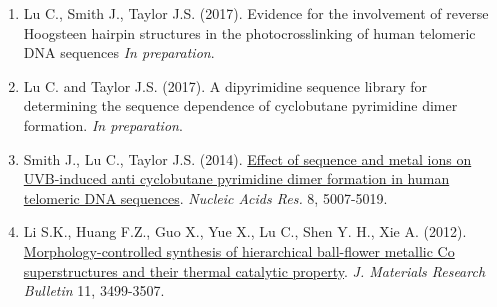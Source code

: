 

\begin{cvparagraph}

\begin{enumerate}
\item Lu C., Smith J., Taylor J.S. (2017). {Evidence for the involvement of reverse Hoogsteen hairpin structures in the photocrosslinking of human telomeric DNA sequences}
  \textit{In preparation}.
\item Lu C. and Taylor J.S. (2017). {A dipyrimidine sequence library for determining the sequence dependence of cyclobutane pyrimidine dimer formation}.
  \textit{In preparation}.
\item Smith J., Lu C., Taylor J.S. (2014). \href{https://academic.oup.com/nar/article/42/8/5007/1075895/Effect-of-sequence-and-metal-ions-on-UVB-induced}{Effect of sequence and metal ions on UVB-induced anti cyclobutane pyrimidine dimer formation in human telomeric DNA sequences}.
  \textit{Nucleic Acids Res.} 8, 5007-5019.
\item Li S.K., Huang F.Z., Guo X., Yue X., Lu C., Shen Y. H., Xie A. (2012).
  \href{http://www.sciencedirect.com.libproxy.wustl.edu/science/article/pii/S0025540812005090}{Morphology-controlled synthesis of hierarchical ball-flower metallic Co superstructures and their thermal catalytic property}.
  \textit{J. Materials Research Bulletin} 11, 3499-3507.
\end{enumerate}
\end{cvparagraph}
